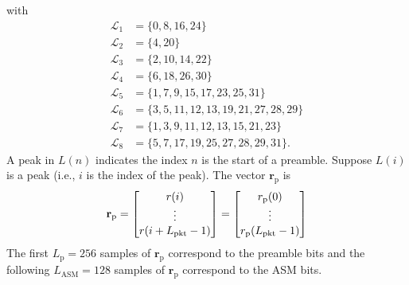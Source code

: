with
\begin{equation}
	\begin{split}
	\mathcal{L}_1 &= \{ 0, 8, 16, 24 \}\\
	\mathcal{L}_2 &= \{ 4, 20 \}\\
	\mathcal{L}_3 &= \{ 2, 10, 14, 22 \}\\
	\mathcal{L}_4 &= \{ 6, 18, 26, 30 \}\\
	\mathcal{L}_5 &= \{ 1, 7,  9, 15, 17, 23, 25, 31 \}\\
	\mathcal{L}_6 &= \{ 3, 5, 11, 12, 13, 19, 21, 27, 28, 29 \}\\
	\mathcal{L}_7 &= \{ 1, 3,  9, 11, 12, 13, 15, 21, 23 \}\\
	\mathcal{L}_8 &= \{ 5, 7, 17, 19, 25, 27, 28, 29, 31 \}.
\end{split}
\label{eq:gpu-L-pedone-geoghegan-4}
\end{equation}
A peak in $L(n)$ indicates the index $n$ is the start of a preamble.
Suppose $L(i)$ is a peak (i.e., $i$ is the index of the peak).
The vector $\mathbf{r}_\text{p}$ is 
\begin{equation}
\mathbf{r}_\text{p} = 
\begin{bmatrix}
r(i) \\ 
\vdots \\ 
r(i+L_\text{pkt}-1)
\end{bmatrix}
=
\begin{bmatrix}
r_\text{p}(0) \\ 
\vdots \\ 
r_\text{p}(L_\text{pkt}-1)
\end{bmatrix}
\end{equation}
The first $L_\text{p} = 256$ samples of $\mathbf{r}_\text{p}$ correspond to the preamble bits and the following
$L_\text{ASM} = 128$ samples of $\mathbf{r}_\text{p}$ correspond to the ASM bits.


